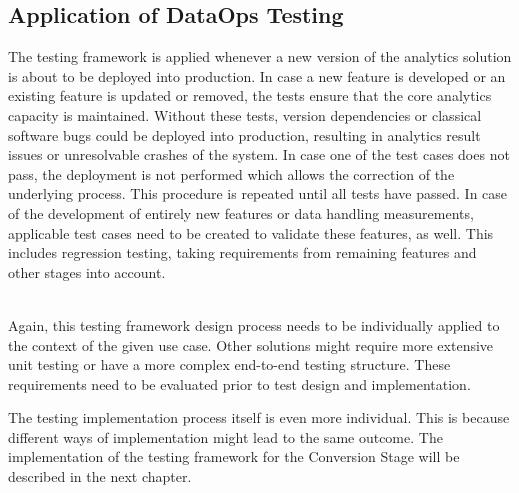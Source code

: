 \subsection{Application of DataOps Testing}
The testing framework is applied whenever a new version of the analytics solution is about to be deployed into production. In case a new feature is developed or an existing feature is updated or removed, the tests ensure that the core analytics capacity is maintained. Without these tests, version dependencies or classical software bugs could be deployed into production, resulting in analytics result issues or unresolvable crashes of the system. In case one of the test cases does not pass, the deployment is not performed which allows the correction of the underlying process. This procedure is repeated until all tests have passed. In case of the development of entirely new features or data handling measurements, applicable test cases need to be created to validate these features, as well. This includes regression testing, taking requirements from remaining features and other stages into account. \\\

Again, this testing framework design process needs to be individually applied to the context of the given use case. Other solutions might require more extensive unit testing or have a more complex end-to-end testing structure. These requirements need to be evaluated prior to test design and implementation.

The testing implementation process itself is even more individual. This is because different ways of implementation might lead to the same outcome. The implementation of the testing framework for the Conversion Stage will be described in the next chapter.
